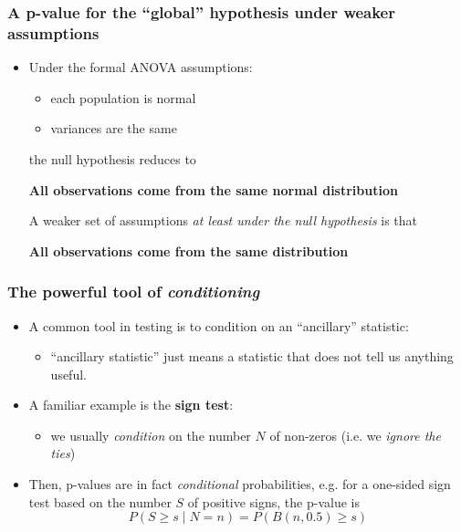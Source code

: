 \documentclass[a4paper]{article}\usepackage[]{graphicx}\usepackage[]{xcolor}
\begin{document}
\subsubsection{A p-value for the ``global'' hypothesis under weaker assumptions}
\begin{itemize}
	\item Under the formal ANOVA assumptions:
	\begin{itemize}
		\item each population is normal
		\item variances are the same
	\end{itemize}
	the null hypothesis reduces to
	\begin{tcolorbox}[goldstyleline, halign= flush center]
		\textbf{All observations come from the same normal distribution}
	\end{tcolorbox}
	A weaker set of assumptions \textit{at least under the null hypothesis} is that
	\begin{tcolorbox}[goldstyleline, halign= flush center]
		\textbf{All observations come from the same distribution}
	\end{tcolorbox}
\end{itemize}
\subsubsection{The powerful tool of \textit{conditioning}}
\begin{itemize}
	\item A common tool in testing is to condition on an ``ancillary'' statistic:
	\begin{itemize}
		\item ``ancillary statistic'' just means a statistic that does not tell us anything useful.
	\end{itemize}
	\item A familiar example is the \textbf{sign test}:
	\begin{itemize}
		\item we usually \textit{condition} on the number \( N \) of non-zeros (i.e. we \textit{ignore the ties})
	\end{itemize}
	\item Then, p-values are in fact \textit{conditional} probabilities, e.g. for a one-sided sign test based on the number \( S \) of positive signs, the p-value is
	\[
		P(S\geq s \mid N=n) = P(B(n,0.5) \geq s)
	\]
\end{itemize}
\end{document}
